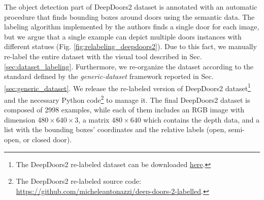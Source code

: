 The object detection part of DeepDoors2 dataset is annotated with an automatic procedure that finds bounding boxes around doors using the semantic data. The labeling algorithm implemented by the authors finds a single door for each image, but we argue that a single example can depict multiple doors instances with different statues (Fig. \ref{fig:relabeling_deepdoors2}). Due to this fact, we manually re-label the entire dataset with the visual tool described in Sec. \ref{sec:dataset_labeling}. Furthermore, we re-organize the dataset according to the standard defined by the \textit{generic-dataset} framework reported in Sec. \ref{sec:generic_dataset}. We release the re-labeled version of DeepDoors2 dataset\footnote{The DeepDoors2 re-labeled dataset can be downloaded \href{https://drive.google.com/file/d/1wSmFUHF9aSJkomwFdOmepMevBvkRpf3D/view?usp=sharing}{here}.} and the necessary Python code\footnote{The DeepDoors2 re-labeled source code: \url{https://github.com/micheleantonazzi/deep-doors-2-labelled}.} to manage it. The final DeepDoors2 dataset is composed of 2998 examples, while each of them includes an RGB image with dimension $480 \times 640 \times 3$, a matrix $480 \times 640$ which contains the depth data, and a list with the bounding boxes' coordinates and the relative labels (open, semi-open, or closed door). 

